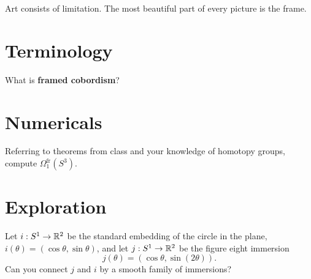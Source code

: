 \documentclass{homework}
\author{Jim Fowler}
\begin{document}
\maketitle

\begin{inspiration}
  Art consists of limitation. The most beautiful part of every picture is the frame.
\end{inspiration}

\section{Terminology}

\begin{problem}
   What is \textbf{framed cobordism}?
\end{problem}

\section{Numericals}

\begin{problem}
  Referring to theorems from class and your knowledge of homotopy groups, compute $\Omega_1^{\mathrm{fr}}(S^3)$.
\end{problem}

\section{Exploration}

\begin{problem}\label{whitney-graustein}
  Let $i : S^1 \to \mathbb{R}^2$ be the standard embedding of the
  circle in the plane, $i(\theta) = \left(\cos \theta, \sin
    \theta\right)$, and let $j : S^1 \to \mathbb{R}^2$ be the figure eight
  immersion $$j(\theta) = \left(\cos \theta, \sin (2\theta)\right).$$
  Can you connect $j$ and $i$ by a smooth family of immersions?
\end{problem}
\end{document}
